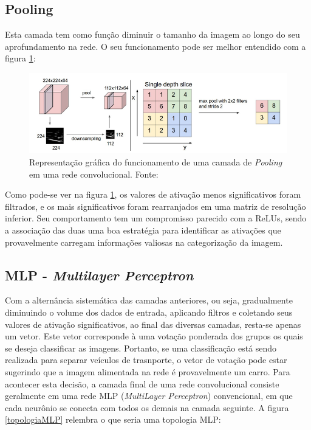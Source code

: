 \documentclass[
	12pt,				%
	oneside,			%
	a4paper,			%
	english,			%
	french,				%
	spanish,			%
	brazil,				%
	]{abntex2}
\begin{document}
\subsection{Pooling}
Esta camada tem como função diminuir o tamanho da imagem ao longo do seu aprofundamento na rede. O seu funcionamento pode ser melhor entendido com a figura \ref{pooling}:

\begin{figure}[H]
	\centering
	\includegraphics[width=.8\textwidth]{imagens/pooling}
	\caption{Representação gráfica do funcionamento de uma camada de \textit{Pooling} em uma rede convolucional. Fonte: \cite{ref3}}
	\label{pooling}
\end{figure} 

Como pode-se ver na figura \ref{pooling}, os valores de ativação menos significativos foram filtrados, e os mais significativos foram rearranjados em uma matriz de resolução inferior. Seu comportamento tem um compromisso parecido com a ReLUs, sendo a associação das duas uma boa estratégia para identificar as ativações que provavelmente carregam informações valiosas na categorização da imagem.

\subsection{MLP - \textit{Multilayer Perceptron}}
Com a alternância sistemática das camadas anteriores, ou seja, gradualmente diminuindo o volume dos dados de entrada, aplicando filtros e coletando seus valores de ativação significativos, ao final das diversas camadas, resta-se apenas um vetor. Este vetor corresponde à uma votação ponderada dos grupos os quais se deseja classificar as imagens. Portanto, se uma classificação está sendo realizada para separar veículos de trasnporte, o vetor de votação pode estar sugerindo que a imagem alimentada na rede é provavelmente um carro. Para acontecer esta decisão, a camada final de uma rede convolucional consiste geralmente em uma rede MLP (\textit{MultiLayer Perceptron}) convencional, em que cada neurônio se conecta com todos os demais na camada seguinte. A figura \ref{topologiaMLP} relembra o que seria uma topologia MLP:
\end{document}
